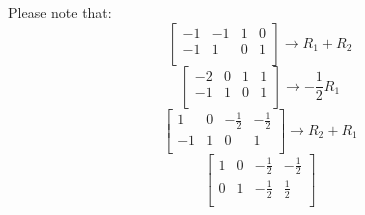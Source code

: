 \documentclass[14pt]{extarticle}
\begin{document}
\bigskip Please note that:
\[
    \left[
    \begin{array}{cc|cc}
        -1 & -1 & 1 & 0 \\
        -1 & 1 & 0 & 1 \\
    \end{array}
    \right] \to R_1 + R_2
\]
\[
    \left[
    \begin{array}{cc|cc}
        -2 & 0 & 1 & 1 \\
        -1 & 1 & 0 & 1 \\
    \end{array}
    \right] \to -\frac{1}{2}R_1
\]
\[
    \left[
    \begin{array}{cc|cc}
        1 & 0 & -\frac{1}{2} & -\frac{1}{2} \\
        -1 & 1 & 0 & 1 \\
    \end{array}
    \right] \to R_2 + R_1
\]
\[
    \left[
    \begin{array}{cc|cc}
        1 & 0 & -\frac{1}{2} & -\frac{1}{2} \\
        0 & 1 & -\frac{1}{2} & \frac{1}{2} \\
    \end{array}
    \right]
\]
\end{document}

